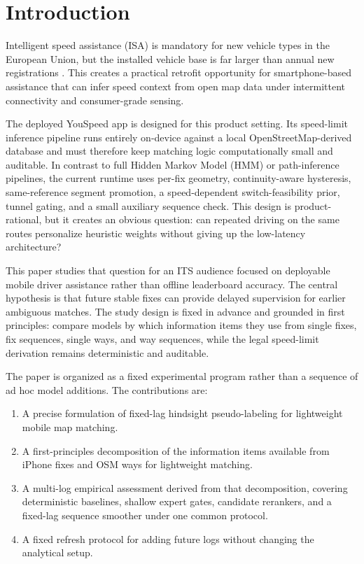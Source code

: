 \documentclass{article}
\begin{document}

\section{Introduction}
Intelligent speed assistance (ISA) is mandatory for new vehicle types in the European Union, but the installed vehicle base is far larger than annual new registrations \cite{eu2019_2144,eu2021_1958,eu_mandatory_safety_2024}. This creates a practical retrofit opportunity for smartphone-based assistance that can infer speed context from open map data under intermittent connectivity and consumer-grade sensing.

The deployed YouSpeed app is designed for this product setting. Its speed-limit inference pipeline runs entirely on-device against a local OpenStreetMap-derived database and must therefore keep matching logic computationally small and auditable. In contrast to full Hidden Markov Model (HMM) or path-inference pipelines, the current runtime uses per-fix geometry, continuity-aware hysteresis, same-reference segment promotion, a speed-dependent switch-feasibility prior, tunnel gating, and a small auxiliary sequence check. This design is product-rational, but it creates an obvious question: can repeated driving on the same routes personalize heuristic weights without giving up the low-latency architecture?

This paper studies that question for an ITS audience focused on deployable mobile driver assistance rather than offline leaderboard accuracy. The central hypothesis is that future stable fixes can provide delayed supervision for earlier ambiguous matches. The study design is fixed in advance and grounded in first principles: compare models by which information items they use from single fixes, fix sequences, single ways, and way sequences, while the legal speed-limit derivation remains deterministic and auditable.

The paper is organized as a fixed experimental program rather than a sequence of ad hoc model additions. The contributions are:
\begin{enumerate}[leftmargin=*,itemsep=2pt]
\item A precise formulation of fixed-lag hindsight pseudo-labeling for lightweight mobile map matching.
\item A first-principles decomposition of the information items available from iPhone fixes and OSM ways for lightweight matching.
\item A multi-log empirical assessment derived from that decomposition, covering deterministic baselines, shallow expert gates, candidate rerankers, and a fixed-lag sequence smoother under one common protocol.
\item A fixed refresh protocol for adding future logs without changing the analytical setup.
\end{enumerate}
\end{document}
